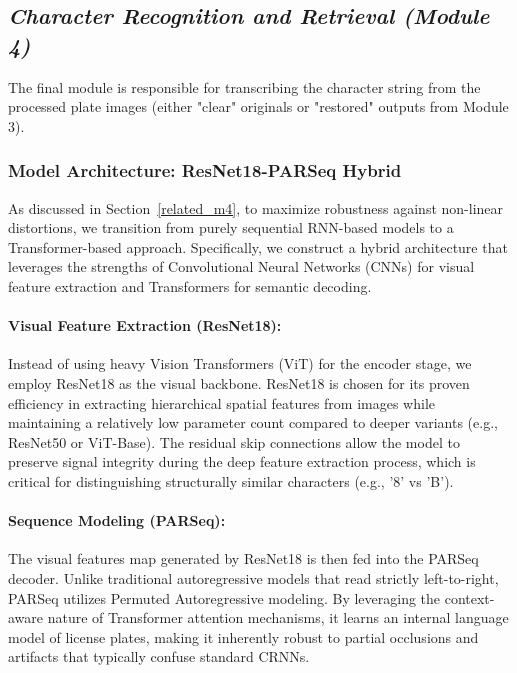 \documentclass[a4paper,11pt,twocolumn]{article}
\begin{document}
	\subsection{\textit{Character Recognition and Retrieval (Module 4)}}
	
	The final module is responsible for transcribing the character string from the processed plate images (either "clear" originals or "restored" outputs from Module 3).
	
	\subsubsection{Model Architecture: ResNet18-PARSeq Hybrid}
	
	As discussed in Section~\ref{related_m4}, to maximize robustness against non-linear distortions, we transition from purely sequential RNN-based models to a Transformer-based approach. Specifically, we construct a hybrid architecture that leverages the strengths of Convolutional Neural Networks (CNNs) for visual feature extraction and Transformers for semantic decoding.
	
	\paragraph{Visual Feature Extraction (ResNet18):}
	Instead of using heavy Vision Transformers (ViT) for the encoder stage, we employ ResNet18 \cite{He2015DeepRL} as the visual backbone. ResNet18 is chosen for its proven efficiency in extracting hierarchical spatial features from images while maintaining a relatively low parameter count compared to deeper variants (e.g., ResNet50 or ViT-Base). The residual skip connections allow the model to preserve signal integrity during the deep feature extraction process, which is critical for distinguishing structurally similar characters (e.g., '8' vs 'B').
	
	\paragraph{Sequence Modeling (PARSeq):}
	The visual features map generated by ResNet18 is then fed into the PARSeq \cite{Bautista2022SceneTR} decoder. Unlike traditional autoregressive models that read strictly left-to-right, PARSeq utilizes Permuted Autoregressive modeling. By leveraging the context-aware nature of Transformer attention mechanisms, it learns an internal language model of license plates, making it inherently robust to partial occlusions and artifacts that typically confuse standard CRNNs.
	
\end{document}
